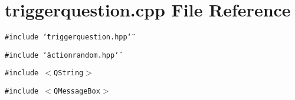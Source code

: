 \section{triggerquestion.cpp File Reference}
\label{triggerquestion_8cpp}
{\tt \#include \char`\"{}triggerquestion.hpp\char`\"{}}\par
{\tt \#include \char`\"{}actionrandom.hpp\char`\"{}}\par
{\tt \#include $<$QString$>$}\par
{\tt \#include $<$QMessage\-Box$>$}\par
